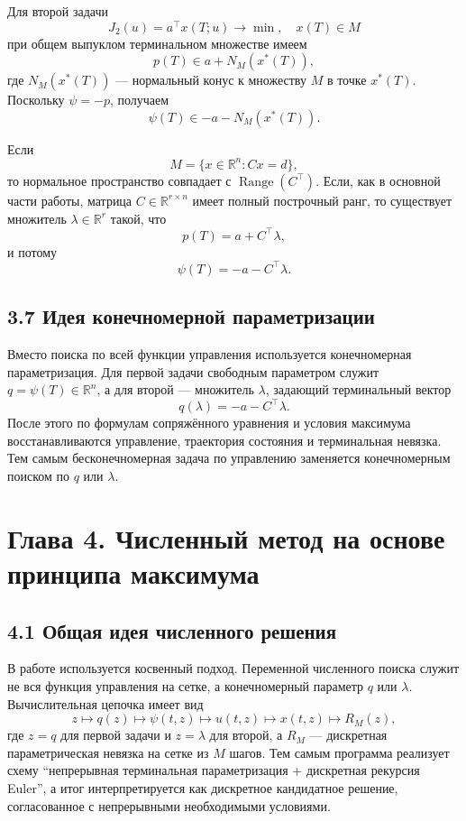 \documentclass[a4paper,12pt]{article}
\begin{document}
Для второй задачи
\[
J_2(u)=a^\top x(T;u)\to\min,\quad x(T)\in M
\]
при общем выпуклом терминальном множестве имеем\cite[с. 121--127]{pontryagin1969}\cite[с. 336--371]{lee1972}
\[
p(T)\in a+N_M(x^*(T)),
\]
где $N_M(x^*(T))$ --- нормальный конус к множеству $M$ в точке $x^*(T)$. Поскольку $\psi=-p$, получаем
\[
\psi(T)\in -a-N_M(x^*(T)).
\]

Если
\[
M=\{x\in\mathbb{R}^n:Cx=d\},
\]
то нормальное пространство совпадает с $\operatorname{Range}(C^\top)$. Если, как в основной части работы, матрица $C\in\mathbb{R}^{r\times n}$ имеет полный построчный ранг, то существует множитель $\lambda\in\mathbb{R}^r$ такой, что
\[
p(T)=a+C^\top\lambda,
\]
и потому
\[
\psi(T)=-a-C^\top\lambda.
\]

\subsection{3.7 Идея конечномерной параметризации}

Вместо поиска по всей функции управления используется конечномерная параметризация. Для первой задачи свободным параметром служит $q=\psi(T)\in\mathbb{R}^n$, а для второй --- множитель $\lambda$, задающий терминальный вектор
\[
q(\lambda)=-a-C^\top\lambda.
\]
После этого по формулам сопряжённого уравнения и условия максимума восстанавливаются управление, траектория состояния и терминальная невязка. Тем самым бесконечномерная задача по управлению заменяется конечномерным поиском по $q$ или $\lambda$\cite[с. 180--190]{kiselev2007}\cite[с. 5--7]{avvakumov1995}.

\section{Глава 4. Численный метод на основе принципа максимума}

\subsection{4.1 Общая идея численного решения}

В работе используется косвенный подход\cite[с. 23--27]{pontryagin1969}\cite[с. 3--7]{avvakumov1995}. Переменной численного поиска служит не вся функция управления на сетке, а конечномерный параметр $q$ или $\lambda$. Вычислительная цепочка имеет вид
\[
z\longmapsto q(z)\longmapsto \psi(t,z)\longmapsto u(t,z)\longmapsto x(t,z)\longmapsto R_M(z),
\]
где $z=q$ для первой задачи и $z=\lambda$ для второй, а $R_M$ --- дискретная параметрическая невязка на сетке из $M$ шагов. Тем самым программа реализует схему ``непрерывная терминальная параметризация + дискретная рекурсия Euler'', а итог интерпретируется как дискретное кандидатное решение, согласованное с непрерывными необходимыми условиями.
\end{document}

